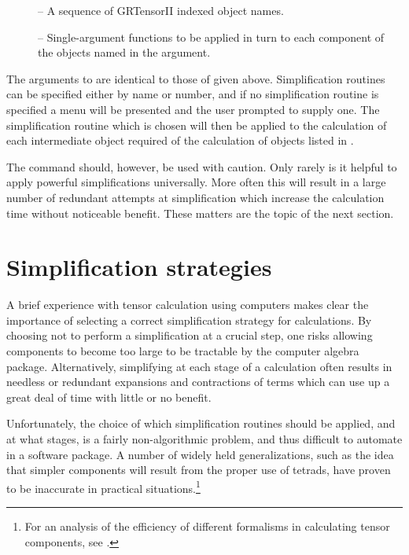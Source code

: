 \documentclass{article}
\begin{document}
{{{\begin{cmdspec}
  \begin{description}
    \item[] -- A sequence of GRTensorII indexed object names.
    \item[] -- Single-argument functions to be applied in
      turn to each component of the objects named in the 
      argument.
  \end{description}

\end{cmdspec}

The arguments to  are identical to those of 
given above. Simplification routines can be specified either by name or
number, and if no simplification routine is specified a menu will be presented
and the user prompted to supply one. The simplification routine which is
chosen will then be applied to the calculation of each intermediate object
required of the calculation of objects listed in .

The  command should, however, be used with caution. Only
rarely is it helpful to apply powerful simplifications universally. More
often this will result in a large number of redundant attempts at
simplification which increase the calculation time without noticeable
benefit.
These matters are the topic of the next section.
%
\section{Simplification strategies} \label{sec:simplification}
%
A brief experience with tensor calculation using computers makes clear
the importance of selecting a correct simplification strategy for
calculations. By choosing not to perform a simplification at a crucial
step, one risks allowing components to become too large to be
tractable by the computer algebra package. Alternatively, simplifying
at each stage of a calculation often results in needless or redundant
expansions and contractions of terms which can use up a great deal of
time with little or no benefit.

Unfortunately, the choice of which simplification routines should be
applied, and at what stages, is a fairly non-algorithmic problem, and
thus difficult to automate in a software package. A number of widely
held generalizations, such as the idea that simpler components will
result from the proper use of tetrads, have proven to be inaccurate in
practical situations.\footnote{For an analysis of the efficiency of
different formalisms in calculating tensor components, see
\cite{pmsl96}.}

}}}
\end{document}
